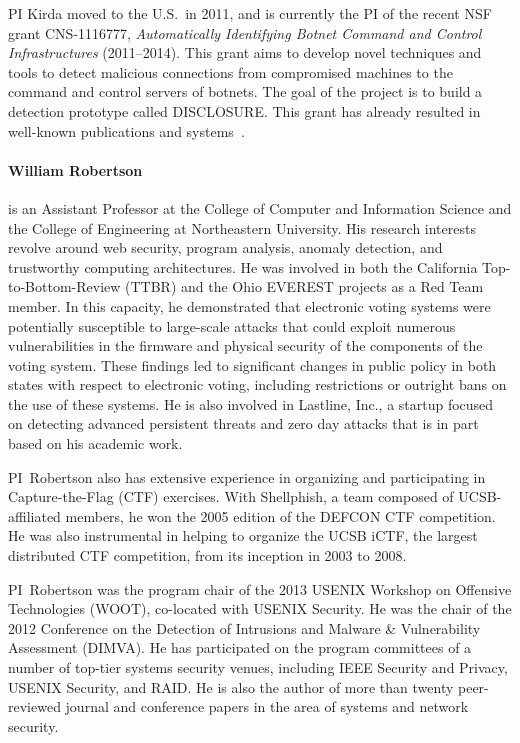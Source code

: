 \documentclass[letterpaper,twoside,11pt,headings=small]{scrartcl}
\begin{document}
PI Kirda moved to the U.S.~in 2011, and is currently the PI of the recent NSF
grant CNS-1116777, {\em Automatically Identifying Botnet Command and Control
Infrastructures} (2011--2014).  This grant aims to develop novel techniques
and tools to detect malicious connections from compromised machines to the
command and control servers of botnets. The goal of the project is to build a
detection prototype called DISCLOSURE. This grant has already resulted in
well-known publications and systems~\cite{acsac2012disclosure,issta2012malware}.

\paragraph{William Robertson} is an Assistant Professor at the College of
Computer and Information Science and the College of Engineering at
Northeastern University.  His research interests revolve around web security,
program analysis, anomaly detection, and trustworthy computing architectures.
He was involved in both the California Top-to-Bottom-Review (TTBR) and the
Ohio EVEREST projects as a Red Team member.  In this capacity, he demonstrated
that electronic voting systems were potentially susceptible to large-scale
attacks that could exploit numerous vulnerabilities in the firmware and
physical security of the components of the voting system.  These findings led
to significant changes in public policy in both states with respect to
electronic voting, including restrictions or outright bans on the use of these
systems.  He is also involved in Lastline, Inc., a startup focused on
detecting advanced persistent threats and zero day attacks that is in part
based on his academic work.

PI~Robertson also has extensive experience in organizing and participating in
Capture-the-Flag (CTF) exercises.  With Shellphish, a team composed of
UCSB-affiliated members, he won the 2005 edition of the DEFCON CTF
competition.  He was also instrumental in helping to organize the UCSB iCTF,
the largest distributed CTF competition, from its inception in 2003 to 2008.

PI~Robertson was the program chair of the 2013 USENIX Workshop on Offensive
Technologies (WOOT), co-located with USENIX Security.  He was the chair of the
2012 Conference on the Detection of Intrusions and Malware \& Vulnerability
Assessment (DIMVA).  He has participated on the program committees of a number
of top-tier systems security venues, including IEEE Security and Privacy,
USENIX Security, and RAID.  He is also the author of more than twenty
peer-reviewed journal and conference papers in the area of systems and network
security.
\end{document}
